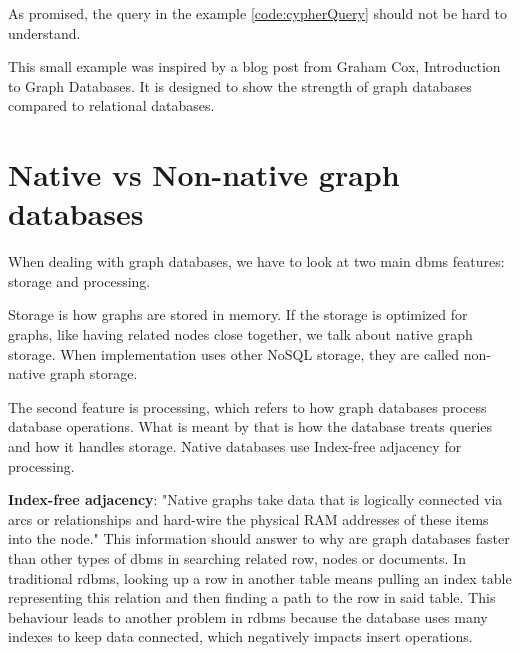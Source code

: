 
As promised, the query in the example \ref{code:cypherQuery} should not be hard to understand.

This small example was inspired by a blog post from Graham Cox, Introduction to Graph Databases. \cite{cox_introduction_2017}
It is designed to show the strength of graph databases compared to relational databases.

\section {Native vs Non-native graph databases}

When dealing with graph databases, we have to look at two main \acrshort{dbms} features: storage and processing.

Storage is how graphs are stored in memory. If the storage is optimized for graphs, like having related nodes close together, we talk about native graph storage.
When implementation uses other NoSQL storage, they are called non-native graph storage.

The second feature is processing, which refers to how graph databases process database operations.
What is meant by that is how the database treats queries and how it handles storage.
Native databases use Index-free adjacency for processing.
\cite{chao_graph_2018}

\textbf{Index-free adjacency}: "Native graphs take data that is logically connected via arcs or relationships and hard-wire the physical RAM addresses of these items into the node." \cite{mccreary_neighborhood_2021}
This information should answer to why are graph databases faster than other types of \acrshort{dbms} in searching related row, nodes or documents.
In traditional \acrshort{rdbms}, looking up a row in another table means pulling an index table representing this relation and then finding a path to the row in said table.
This behaviour leads to another problem in \acrshort{rdbms} because the database uses many indexes to keep data connected, which negatively impacts insert operations.

